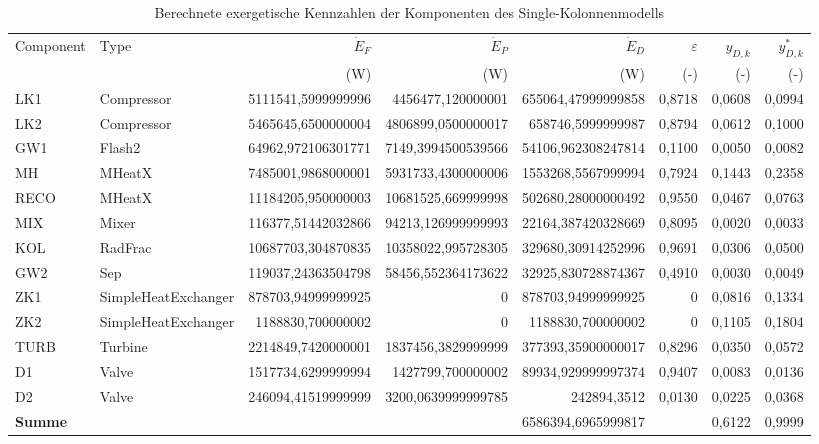 \begin{longtable}{llrrrrrr}
\caption{Berechnete exergetische Kennzahlen der Komponenten des Single-Kolonnenmodells} \\
\hline
Component & Type & $\dot{E}_F$ & $\dot{E}_P$ & $\dot{E}_D$ & $\varepsilon$ & $y_{D,k}$ & $y^*_{D,k}$ \\
 &  & (W) & (W) & (W) & (-) & (-) & (-) \\
\hline
LK1 & Compressor & 5111541,5999999996 & 4456477,120000001 & 655064,47999999858 & 0,8718 & 0,0608 & 0,0994 \\
LK2 & Compressor & 5465645,6500000004 & 4806899,0500000017 & 658746,5999999987 & 0,8794 & 0,0612 & 0,1000 \\
GW1 & Flash2 & 64962,972106301771 & 7149,3994500539566 & 54106,962308247814 & 0,1100 & 0,0050 & 0,0082 \\
MH & MHeatX & 7485001,9868000001 & 5931733,4300000006 & 1553268,5567999994 & 0,7924 & 0,1443 & 0,2358 \\
RECO & MHeatX & 11184205,950000003 & 10681525,669999998 & 502680,28000000492 & 0,9550 & 0,0467 & 0,0763 \\
MIX & Mixer & 116377,51442032866 & 94213,126999999993 & 22164,387420328669 & 0,8095 & 0,0020 & 0,0033 \\
KOL & RadFrac & 10687703,304870835 & 10358022,995728305 & 329680,30914252996 & 0,9691 & 0,0306 & 0,0500 \\
GW2 & Sep & 119037,24363504798 & 58456,552364173622 & 32925,830728874367 & 0,4910 & 0,0030 & 0,0049 \\
ZK1 & SimpleHeatExchanger & 878703,94999999925 & 0 & 878703,94999999925 & 0 & 0,0816 & 0,1334 \\
ZK2 & SimpleHeatExchanger & 1188830,700000002 & 0 & 1188830,700000002 & 0 & 0,1105 & 0,1804 \\
TURB & Turbine & 2214849,7420000001 & 1837456,3829999999 & 377393,35900000017 & 0,8296 & 0,0350 & 0,0572 \\
D1 & Valve & 1517734,6299999994 & 1427799,700000002 & 89934,929999997374 & 0,9407 & 0,0083 & 0,0136 \\
D2 & Valve & 246094,41519999999 & 3200,0639999999785 & 242894,3512 & 0,0130 & 0,0225 & 0,0368 \\
\hline
\textbf{Summe} &  &  &  & 6586394,6965999817 &  & 0,6122 & 0,9999 \\
\hline
\end{longtable}